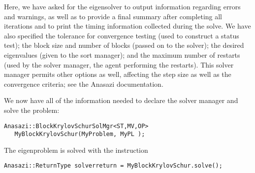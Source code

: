Here, we have asked for the eigensolver to output information regarding errors and
warnings, as well as to provide a final summary after completing all iterations and to
print the timing information collected during the solve. We have also specified the
tolerance for convergence testing (used to construct a status test); the block size and
number of blocks (passed on to the solver); the desired eigenvalues (given to the sort
manager); and the maximum number of restarts (used by the solver manager, the agent
performing the restarts). This solver manager permits other options as well, affecting the
step size as well as the convergence criteria; see the Anasazi documentation.

We now have all of the information needed to declare the solver manager and solve the
problem:
\begin{verbatim}
Anasazi::BlockKrylovSchurSolMgr<ST,MV,OP> 
   MyBlockKrylovSchur(MyProblem, MyPL );
\end{verbatim}
The eigenproblem is solved with the instruction
\begin{verbatim}
Anasazi::ReturnType solverreturn = MyBlockKrylovSchur.solve();
\end{verbatim}

